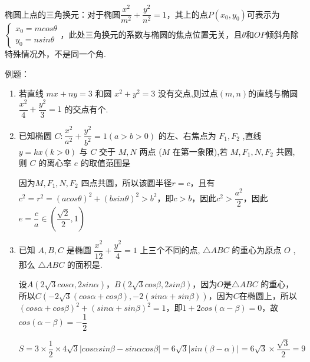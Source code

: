 椭圆上点的三角换元：对于椭圆$\dfrac{x^2}{m^2}+\dfrac{y^2}{n^2} = 1$，其上的点$P(x_0, y_0)$可表示为$\left\{\begin{array}{l}
     x_0 = mcos\theta \\
     y_0 = nsin\theta
\end{array}\right.$，此处三角换元的系数与椭圆的焦点位置无关，且$\theta$和$OP$倾斜角除特殊情况外，不是同一个角.

例题：
\begin{enumerate}
    \item 若直线 ${mx} + {ny} = 3$ 和圆 ${x}^{2} + {y}^{2} = 3$ 没有交点,则过点$(m, n)$的直线与椭圆 $\dfrac{{x}^{2}}{4} + \dfrac{{y}^{2}}{3} = 1$ 的交点有个.

    \item 已知椭圆 $C : \dfrac{{x}^{2}}{{a}^{2}} + \dfrac{{y}^{2}}{{b}^{2}} = 1\left( {a > b > 0}\right)$ 的左、右焦点为 ${F}_{1},{F}_{2}$ ,直线 $y = {kx}\left( {k > 0}\right)$ 与 $C$ 交于 $M,N$ 两点 ($M$ 在第一象限),若 $M,{F}_{1},N,{F}_{2}$ 共圆,则 $C$ 的离心率 $e$ 的取值范围是
        \begin{jieda}
            因为$M,{F}_{1},N,{F}_{2}$ 四点共圆，所以该圆半径$r = c$，且有$c^2 = r^2 = (acos\theta)^2+(bsin\theta)^2 > b^2$，即$c > b$，因此$c^2 > \dfrac{a^2}{2}$，因此$e = \dfrac{c}{a} \in \left(\dfrac{\sqrt{2}}{2}, 1\right)$
        \end{jieda}
    
    \item 已知 $A,B,C$ 是椭圆 $\dfrac{{x}^{2}}{12} + \dfrac{{y}^{2}}{4} = 1$ 上三个不同的点, $\bigtriangleup  {ABC}$ 的重心为原点 $O$ ,那么 $\bigtriangleup  {ABC}$ 的面积是.
    \begin{jieda}
        设$A(2\sqrt{3}cos\alpha, 2sin\alpha)$，$B(2\sqrt{3}cos\beta, 2sin\beta)$，因为$O$是$\bigtriangleup  {ABC}$ 的重心，所以$C(-2\sqrt{3}(cos\alpha + cos\beta), -2(sin\alpha+sin\beta))$，因为$C$在椭圆上，所以$(cos\alpha + cos\beta)^2+(sin\alpha+sin\beta)^2 = 1$，即$1+2cos(\alpha-\beta) = 0$，故$cos(\alpha - \beta) = -\dfrac{1}{2}$

        $S = 3 \times \dfrac{1}{2} \times 4\sqrt{3}|cos\alpha sin\beta - sin\alpha cos\beta| = 6\sqrt{3}|sin(\beta-\alpha)| = 6\sqrt{3} \times \dfrac{\sqrt{3}}{2} = 9$
    \end{jieda}
    

\end{enumerate}
